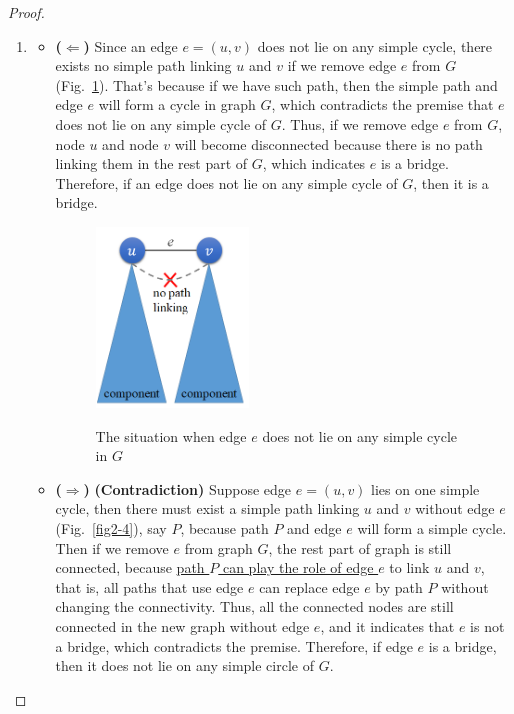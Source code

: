 \documentclass[12pt,a4paper]{article}
\theoremstyle{definition}
\begin{document}
\begin{enumerate}
\begin{proof}
\begin{enumerate}
\begin{itemize}
        \end{itemize}
    \item
        \begin{itemize}
        \item \textbf{($\Longleftarrow$)} Since an edge $e = (u, v)$ does not lie on any simple cycle, there exists no simple path linking $u$ and $v$ if we remove edge $e$ from $G$ (Fig.~\ref{fig2-3}). That's because if we have such path, then the simple path and edge $e$ will form a cycle in graph $G$, which contradicts the premise that $e$ does not lie on any simple cycle of $G$. Thus, if we remove edge $e$ from $G$, node $u$ and node $v$ will become disconnected because there is no path linking them in the rest part of $G$, which indicates $e$ is a bridge. Therefore, if an edge does not lie on any simple cycle of $G$, then it is a bridge.
            \begin{figure}[h]
              \centering
              \includegraphics[width=1.6in]{figures/prob2-2-1.png}\\
              \caption{The situation when edge $e$ does not lie on any simple cycle in $G$}\label{fig2-3}
            \end{figure}
        \item \textbf{($\Longrightarrow$)} \textbf{(Contradiction)} Suppose edge $e = (u,v)$ lies on one simple cycle, then there must exist a simple path linking $u$ and $v$ without edge $e$ (Fig.~\ref{fig2-4}), say $P$, because path $P$ and edge $e$ will form a simple cycle. Then if we remove $e$ from graph $G$, the rest part of graph is still connected, because \underline{path $P$ can play the role of edge $e$} to link $u$ and $v$, that is, all paths that use edge $e$ can replace edge $e$ by path $P$ without changing the connectivity. Thus, all the connected nodes are still connected in the new graph without edge $e$, and it indicates that $e$ is not a bridge, which contradicts the premise. Therefore, if edge $e$ is a bridge, then it does not lie on any simple circle of $G$.
            \begin{figure}[h]

\end{figure}
\end{itemize}
\end{enumerate}
\end{proof}
\end{enumerate}
\end{document}
